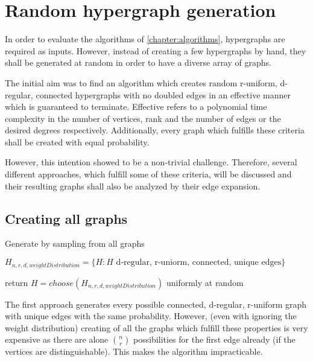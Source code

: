 \chapter{Random hypergraph generation }\label{chapter:random_hypergraphs}
In order to evaluate the algorithms of \cref{chapter:algorithms}, hypergraphs are required as inputs. However, instead of creating a few hypergraphs by hand, they shall be generated at random in order to have a diverse array of graphs.

The initial aim was to find an algorithm which creates random r-uniform, d-regular, connected hypergraphs with no doubled edges in an effective manner which is guaranteed to terminate. Effective refers to a polynomial time complexity in the number of vertices, rank and the number of edges or the desired degrees respectively. Additionally, every graph which fulfills these criteria shall be created with equal probability.

However, this intention showed to be a non-trivial challenge. Therefore, several different approaches, which fulfill some of these criteria, will be discussed and their resulting graphs shall also be analyzed by their edge expansion.
\section{Creating all graphs}

\begin{algorithm}[htpb]
	\caption{Generate by sampling from all graphs\label{alg:sample_all_graphs}} 
	\begin{algorithmic}
		\State $H_{n,r,d,  weightDistribution} = \{H: H\text{ d-regular, r-uniorm, connected, unique edges}\}$
	
		\State return $H = choose(H_{n,r,d,  weightDistribution})$ \Comment uniformly at random
		\EndFunction 
	\end{algorithmic}
\end{algorithm}	
The first approach generates every possible connected, d-regular, r-uniform graph with unique edges with the same probability. However, (even with ignoring the weight distribution) creating of all the graphs which fulfill these properties is very expensive as there are alone $n \choose r$ possibilities for the first edge already (if the vertices are distinguishable). This makes the algorithm impracticable. 

